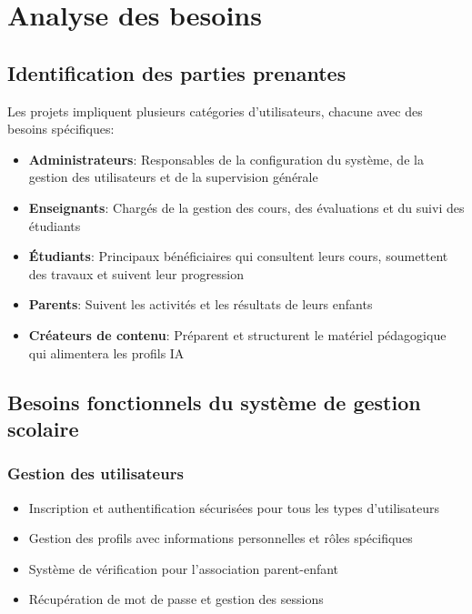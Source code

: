 \section{Analyse des besoins}

\subsection{Identification des parties prenantes}

Les projets impliquent plusieurs catégories d'utilisateurs, chacune avec des besoins spécifiques:

\begin{itemize}
  \item \textbf{Administrateurs}: Responsables de la configuration du système, de la gestion des utilisateurs et de la supervision générale
  
  \item \textbf{Enseignants}: Chargés de la gestion des cours, des évaluations et du suivi des étudiants
  
  \item \textbf{Étudiants}: Principaux bénéficiaires qui consultent leurs cours, soumettent des travaux et suivent leur progression
  
  \item \textbf{Parents}: Suivent les activités et les résultats de leurs enfants
  
  \item \textbf{Créateurs de contenu}: Préparent et structurent le matériel pédagogique qui alimentera les profils IA
\end{itemize}

\subsection{Besoins fonctionnels du système de gestion scolaire}

\subsubsection{Gestion des utilisateurs}

\begin{itemize}
  \item Inscription et authentification sécurisées pour tous les types d'utilisateurs
  \item Gestion des profils avec informations personnelles et rôles spécifiques
  \item Système de vérification pour l'association parent-enfant
  \item Récupération de mot de passe et gestion des sessions
\end{itemize}

